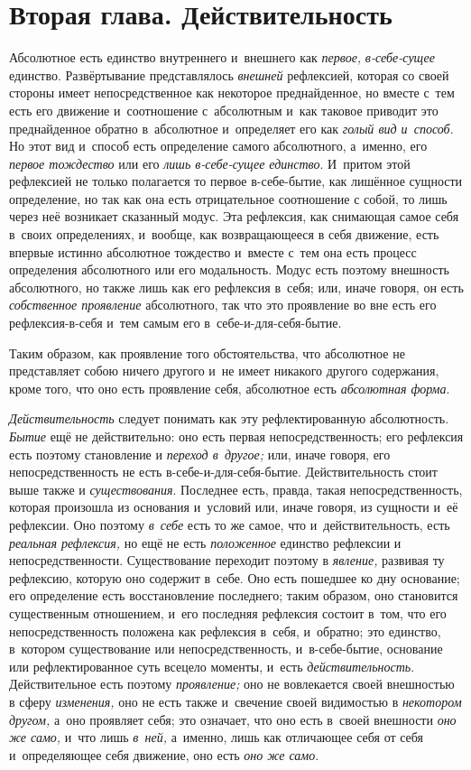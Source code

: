 \chapter[{\em Вторая глава} Действительность]{Вторая глава. Действительность}

Абсолютное есть единство внутреннего и~внешнего как {\em первое,}
{\em в-себе-сущее} единство. Развёртывание
представлялось {\em внешней} рефлексией, которая со
своей стороны имеет непосредственное как некоторое преднайденное, но вместе
с~тем есть его движение и~соотношение с~абсолютным и~как таковое приводит
это преднайденное обратно в~абсолютное и~определяет его как
{\em голый вид и~способ}. Но этот вид и~способ есть
определение самого абсолютного, а~именно, его
{\em первое тождество} или его
{\em лишь в-себе-сущее единство}. И~притом этой
рефлексией не только полагается то первое в-себе-бытие, как лишённое
сущности определение, но так как она есть отрицательное соотношение с
собой, то лишь через неё возникает сказанный модус. Эта рефлексия, как
снимающая самое себя в~своих определениях, и~вообще, как возвращающееся в
себя движение, есть впервые истинно абсолютное тождество и~вместе с~тем она
есть процесс определения абсолютного или его модальность. Модус есть
поэтому внешность абсолютного, но также лишь как его рефлексия в~себя; или,
иначе говоря, он есть {\em собственное проявление}
абсолютного, так что это проявление во вне есть его рефлексия-в-себя и~тем
самым его в~себе-и-для-себя-бытие.

Таким образом, как проявление того обстоятельства, что абсолютное не
представляет собою ничего другого и~не имеет никакого другого содержания, кроме
того, что оно есть проявление себя, абсолютное есть {\em абсолютная форма}.

{\em Действительность} следует понимать как эту
рефлектированную абсолютность. {\em Бытие} ещё не
действительно: оно есть первая непосредственность; его рефлексия есть
поэтому становление и {\em переход в~другое;} или,
иначе говоря, его непосредственность не есть в-себе-и-для-себя-бытие.
Действительность стоит выше также и
{\em существования}. Последнее есть, правда, такая
непосредственность, которая произошла из основания и~условий или, иначе
говоря, из сущности и~её рефлексии. Оно поэтому
{\em в~себе} есть то же самое, что и~действительность,
есть {\em реальная рефлексия,} но ещё не есть
{\em положенное} единство рефлексии и
непосредственности. Существование переходит поэтому в
{\em явление,} развивая ту рефлексию, которую оно
содержит в~себе. Оно есть пошедшее ко дну основание; его определение есть
восстановление последнего; таким образом, оно становится существенным
отношением, и~его последняя рефлексия состоит в~том, что его
непосредственность положена как рефлексия в~себя, и~обратно; это единство,
в~котором существование или непосредственность, и~в-себе-бытие, основание
или рефлектированное суть всецело моменты, и~есть
{\em действительность}. Действительное есть поэтому
{\em проявление;} оно не вовлекается своей внешностью в
сферу {\em изменения,} оно не есть также и~свечение
своей видимостью в {\em некотором другом,} а~оно
проявляет себя; это означает, что оно есть в~своей внешности
{\em оно же само,} и~что лишь
{\em в~ней,} а~именно, лишь как отличающее себя от себя
и~определяющее себя движение, оно есть {\em оно же
само}.

